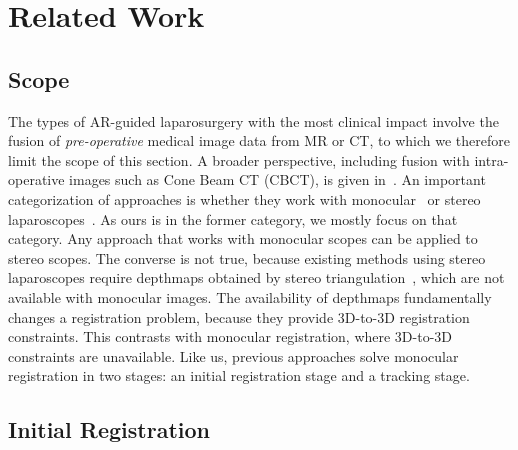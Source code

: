 
\section{Related Work}
\label{sec:sota}
\subsection{Scope}
The types of AR-guided laparosurgery with the most clinical impact involve the fusion of \emph{pre-operative} medical image data from MR or CT, to which we therefore limit the scope of this section.
A broader perspective, including fusion with intra-operative images such as Cone Beam CT (CBCT), is given in~\cite{Bernhardt2017}.
An important categorization of approaches is whether they work with monocular~\cite{affineTracking} or stereo laparoscopes~\cite{21142942,conf/miccai/Amir-KhaliliNPHA13,Cohen2010Prostate,hamarneh2014igrs,haouchine13,Su2009, MaierHein2013}.
As ours is in the former category, we mostly focus on that category.
Any approach that works with monocular scopes can be applied to stereo scopes. The converse is not true, because existing methods using stereo laparoscopes require depthmaps obtained by stereo triangulation~\cite{DBLP:conf/miccai/StoyanovSPY10}, which are not available with monocular images.
The availability of depthmaps fundamentally changes a registration problem, because they provide 3D-to-3D registration constraints.
This contrasts with monocular registration, where 3D-to-3D constraints are unavailable.
Like us, previous approaches solve monocular registration in two stages: an initial registration stage and a tracking stage.

\subsection{Initial Registration}

